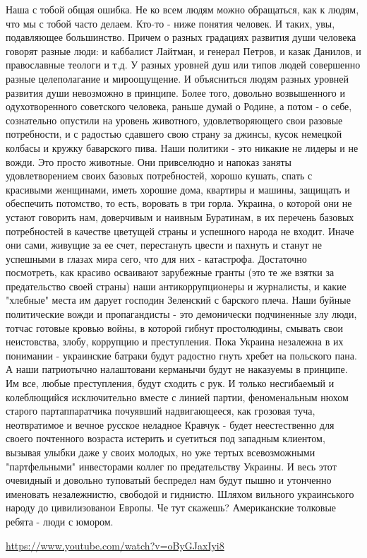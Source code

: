 Наша с тобой общая ошибка. Не ко всем людям можно обращаться, как к людям, что мы с тобой часто делаем. Кто-то - ниже понятия человек. И таких, увы, подавляющее большинство. Причем о разных градациях развития души человека говорят разные люди: и каббалист Лайтман, и генерал Петров, и казак Данилов, и православные теологи и т.д.
У разных уровней душ или типов людей совершенно разные целеполагание и мироощущение. И объясниться людям разных уровней развития души невозможно в принципе.
Более того, довольно возвышенного и одухотворенного советского человека, раньше думай о Родине, а потом - о себе, сознательно опустили на уровень животного, удовлетворяющего свои разовые потребности, и с радостью сдавшего свою страну за джинсы, кусок немецкой колбасы и кружку баварского пива.
Наши политики - это никакие не лидеры и не вожди. Это просто животные. Они привселюдно и напоказ заняты удовлетворением своих базовых потребностей, хорошо кушать, спать с красивыми женщинами, иметь хорошие дома, квартиры и машины, защищать и обеспечить потомство, то есть, воровать в три горла.
Украина, о которой они не устают говорить нам, доверчивым и наивным Буратинам, в их перечень базовых потребностей в качестве цветущей страны и успешного народа не входит.
Иначе они сами, живущие за ее счет, перестануть цвести и пахнуть и станут не успешными в глазах мира сего, что для них - катастрофа.
Достаточно посмотреть, как красиво осваивают зарубежные гранты (это те же взятки за предательство своей страны) наши антикоррупционеры и журналисты, и какие "хлебные" места им дарует господин Зеленский с барского плеча.
Наши буйные политические вожди и пропагандисты - это демонически подчиненные злу люди, тотчас готовые кровью войны, в которой гибнут простолюдины, смывать свои неистовства, злобу, коррупцию и преступления.
Пока Украина незалежна в их понимании - украинские батраки будут радостно гнуть хребет на польского пана. А наши патриотычно налаштовани керманычи будут не наказуемы в принципе. Им все, любые преступления, будут сходить с рук.
И только несгибаемый и колеблющийся исключительно вместе с линией партии, феноменальным нюхом старого партаппаратчика почуявший надвигающееся, как грозовая туча, неотвратимое и вечное русское неладное Кравчук - будет неестественно для своего почтенного возраста истерить и суетиться под западным клиентом, вызывая улыбки даже у своих молодых, но уже тертых всевозможными "партфельными" инвесторами коллег по предательству Украины.
И весь этот очевидный и довольно туповатый беспредел нам будут пышно и утонченно именовать незалежнистю, свободой и гиднистю. Шляхом вильного украинського народу до цивилизованои Европы.
Че тут скажешь? Американские толковые ребята - люди с юмором.

\url{https://www.youtube.com/watch?v=oByGJaxIyi8}
